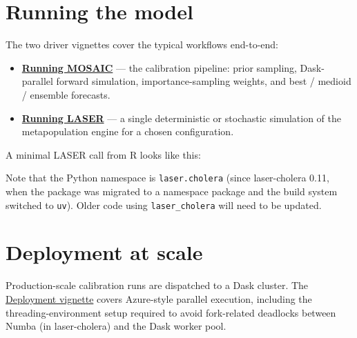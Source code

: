 \documentclass[
]{book}
\newenvironment{Shaded}{\begin{snugshade}}{\end{snugshade}}
\newcommand{\AttributeTok}[1]{\textcolor[rgb]{0.13,0.29,0.53}{#1}}
\newcommand{\FunctionTok}[1]{\textcolor[rgb]{0.13,0.29,0.53}{\textbf{#1}}}
\newcommand{\NormalTok}[1]{#1}
\newcommand{\OtherTok}[1]{\textcolor[rgb]{0.56,0.35,0.01}{#1}}
\newcommand{\SpecialCharTok}[1]{\textcolor[rgb]{0.81,0.36,0.00}{\textbf{#1}}}
\newcommand{\StringTok}[1]{\textcolor[rgb]{0.31,0.60,0.02}{#1}}
\providecommand{\tightlist}{%
  \setlength{\itemsep}{0pt}\setlength{\parskip}{0pt}}
\begin{document}
\section{Running the model}\label{running-the-model}

The two driver vignettes cover the typical workflows end-to-end:

\begin{itemize}
\tightlist
\item
  \textbf{\href{https://institutefordiseasemodeling.github.io/MOSAIC-pkg/articles/Running-MOSAIC.html}{Running MOSAIC}} --- the calibration pipeline: prior sampling, Dask-parallel forward simulation, importance-sampling weights, and best / medioid / ensemble forecasts.
\item
  \textbf{\href{https://institutefordiseasemodeling.github.io/MOSAIC-pkg/articles/Running-LASER.html}{Running LASER}} --- a single deterministic or stochastic simulation of the metapopulation engine for a chosen configuration.
\end{itemize}

A minimal LASER call from R looks like this:

\begin{Shaded}
\end{Shaded}

Note that the Python namespace is \texttt{laser.cholera} (since laser-cholera 0.11, when the package was migrated to a namespace package and the build system switched to \texttt{uv}). Older code using \texttt{laser\_cholera} will need to be updated.

\section{Deployment at scale}\label{deployment-at-scale}

Production-scale calibration runs are dispatched to a Dask cluster. The \href{https://institutefordiseasemodeling.github.io/MOSAIC-pkg/articles/Deployment.html}{Deployment vignette} covers Azure-style parallel execution, including the threading-environment setup required to avoid fork-related deadlocks between Numba (in laser-cholera) and the Dask worker pool.
\end{document}
